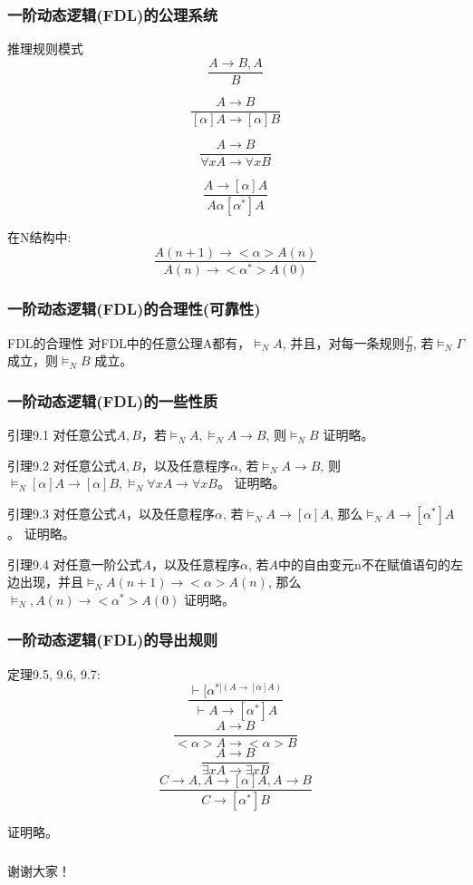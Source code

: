 \documentclass{beamer}
\begin{document}
\begin{frame}
	\frametitle{一阶动态逻辑(FDL)的公理系统}
	推理规则模式
		\[ \frac{A \rightarrow B, A }{B} \]
		
		\[ \frac{A \rightarrow B }{ [\alpha]A \rightarrow [\alpha]B }  \]
		
		\[ \frac{A \rightarrow B }{\forall xA \rightarrow \forall xB } \]
		
		\[ \frac{A \rightarrow [\alpha]A }{A \alpha [\alpha ^{*}]A } \]

在N结构中:
		\[ \frac{A(n+1) \rightarrow <\alpha>A(n) }{A(n) \rightarrow <\alpha^{*}>A(0)} \]
\end{frame}


\begin{frame}
	\frametitle{一阶动态逻辑(FDL)的合理性(可靠性)}
	\begin{block}{FDL的合理性}
		对FDL中的任意公理A都有，$\models _{N} A$, 并且，对每一条规则$\frac{\Gamma}{B}$, 若$\models _{N} \Gamma $成立，则$\models _{N} B$ 成立。
	\end{block}
\end{frame}



\begin{frame}
	\frametitle{一阶动态逻辑(FDL)的一些性质}
	\begin{block}{引理9.1}
		对任意公式$A,B$，若$\models _{N} A, \models _{N} A \rightarrow B$, 则$\models _{N}B$
		证明略。
	\end{block}
	\begin{block}{引理9.2}
		对任意公式$A,B$，以及任意程序$\alpha$, 若$\models _{N} A \rightarrow B$, 则 $\models _{N} [\alpha]A \rightarrow [\alpha]B, \models _{N} \forall xA \rightarrow \forall xB $。
		证明略。
	\end{block}

	\begin{block}{引理9.3}
		对任意公式$A$，以及任意程序$\alpha$, 若$\models _{N} A \rightarrow [\alpha]A$, 那么$\models _{N} A \rightarrow [\alpha ^{*}]A$。
		证明略。
	\end{block}
	\begin{block}{引理9.4}
		对任意一阶公式$A$，以及任意程序$\alpha$, 若$A$中的自由变元n不在赋值语句的左边出现，并且$\models _{N} A(n+1) \rightarrow <\alpha>A(n)$, 那么 $\models _{N}, A(n) \rightarrow <\alpha^{*}>A(0)$
		证明略。
	\end{block}
\end{frame}



\begin{frame}
	\frametitle{一阶动态逻辑(FDL)的导出规则}
	定理9.5, 9.6, 9.7:
		\[ \frac{\vdash [\alpha^{*](A \rightarrow [\alpha]A)}}{\vdash A \rightarrow [\alpha^{*}]A} \]
		\[ \frac{A \rightarrow B}{<\alpha>A \rightarrow <\alpha>B} \]
		\[ \frac{A \rightarrow B}{\exists xA \rightarrow \exists xB} \]
		\[ \frac{C \rightarrow A, A \rightarrow [\alpha]A, A \rightarrow B}{C \rightarrow [\alpha^{*}]B} \]

	证明略。
\end{frame}



\begin{frame}
	\frametitle{}
	\begin{center}
		谢谢大家！
	\end{center}
\end{frame}

\end{document}
